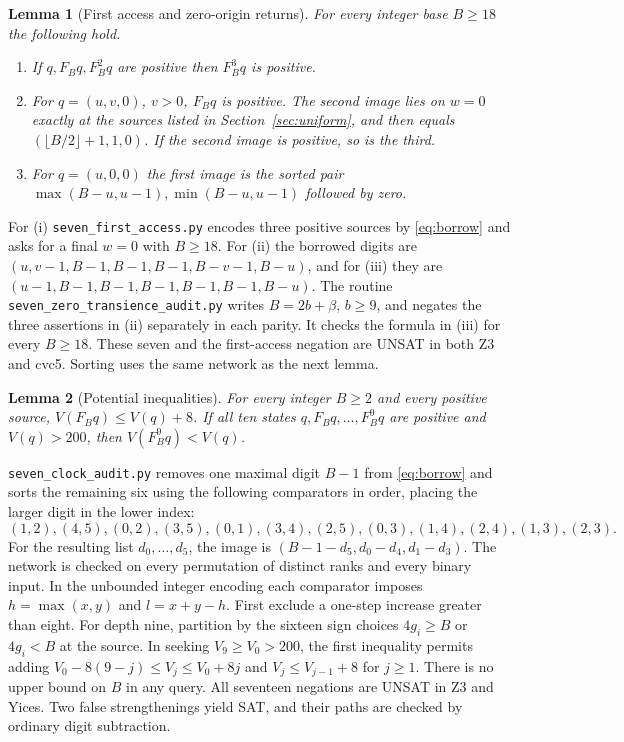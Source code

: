 \documentclass[11pt,reqno]{amsart}
\newtheorem{lemma}{Lemma}[section]
\begin{document}
\begin{lemma}[First access and zero-origin returns]\label{l:zero}
For every integer base $B\ge18$ the following hold.
\begin{enumerate}
\item[(i)] If $q,F_Bq,F_B^2q$ are positive then $F_B^3q$ is positive.
\item[(ii)] For $q=(u,v,0)$, $v>0$, $F_Bq$ is positive. The second
image lies on $w=0$ exactly at the sources listed in Section~\ref{sec:uniform}, and then
equals $(\lfloor B/2\rfloor+1,1,0)$. If the second image is positive,
so is the third.
\item[(iii)] For $q=(u,0,0)$ the first image is the sorted pair
$\max(B-u,u-1),\min(B-u,u-1)$ followed by zero.
\end{enumerate}
\end{lemma}
\noindent
For (i) \texttt{seven\_first\_access.py} encodes three positive sources
by \eqref{eq:borrow} and asks for a final $w=0$ with $B\ge18$.
For (ii) the borrowed digits are
$(u,v-1,B-1,B-1,B-1,B-v-1,B-u)$, and for (iii) they are
$(u-1,B-1,B-1,B-1,B-1,B-1,B-u)$. The routine
\texttt{seven\_zero\_transience\_audit.py} writes $B=2b+\beta$,
$b\ge9$, and negates the three assertions in (ii) separately in each
parity. It checks the formula in (iii) for every $B\ge18$. These seven
and the first-access negation are UNSAT in both Z3 and cvc5. Sorting uses
the same network as the next lemma.

\begin{lemma}[Potential inequalities]\label{l:clock}
For every integer $B\ge2$ and every positive source,
$V(F_Bq)\le V(q)+8$. If all ten states $q,F_Bq,\ldots,F_B^9q$ are
positive and $V(q)>200$, then $V(F_B^9q)<V(q)$.
\end{lemma}
\noindent
\texttt{seven\_clock\_audit.py} removes one maximal digit $B-1$ from
\eqref{eq:borrow} and sorts the remaining six using the following
comparators in order, placing the larger digit in the lower index:
\[
 (1,2),(4,5),(0,2),(3,5),(0,1),(3,4),
 (2,5),(0,3),(1,4),(2,4),(1,3),(2,3).
\]
For the resulting list $d_0,\ldots,d_5$, the image is
$(B-1-d_5,d_0-d_4,d_1-d_3)$. The network is checked on every permutation
of distinct ranks and every binary input. In the unbounded integer
encoding each comparator imposes $h=\max(x,y)$ and $l=x+y-h$.
First exclude a one-step increase greater than eight. For depth nine,
partition by the sixteen sign choices $4g_i\ge B$ or $4g_i<B$ at the
source. In seeking $V_9\ge V_0>200$, the first inequality permits adding
$V_0-8(9-j)\le V_j\le V_0+8j$ and $V_j\le V_{j-1}+8$ for $j\ge1$.
There is no upper bound on $B$ in any query. All seventeen negations
are UNSAT in Z3 and Yices. Two false strengthenings yield SAT, and their
paths are checked by ordinary digit subtraction.
\end{document}
